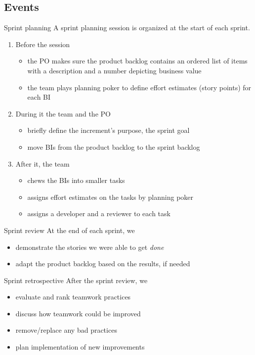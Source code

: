 \documentclass{beamer}
\begin{document}
\subsection{Events}
\begin{frame}{Sprint planning}
  A sprint planning session is organized at the start of each sprint.
  \begin{enumerate}
  \item Before the session
    \begin{itemize}
    \item the PO makes sure the \alert{product backlog} contains an ordered list
    of items with a description and a number depicting business value
    \item the team plays planning poker to define effort estimates
    (\alert{story points}) for each BI
    \end{itemize}
  \item During it the team and the PO
    \begin{itemize}
    \item briefly define the increment's purpose, the \alert{sprint goal}
    \item move BIs from the product backlog to the \alert{sprint backlog}
    \end{itemize}
  \item After it, the team
    \begin{itemize}
    \item chews the BIs into \alert{smaller tasks}
    \item assigns effort estimates on the tasks by \alert{planning poker}
    \item assigns a \alert{developer and a reviewer} to each task
    \end{itemize}
  \end{enumerate}
\end{frame}
\begin{frame}{Sprint review}
  At the end of each sprint, we
  \begin{itemize}
  \item demonstrate the stories we were able to get \emph{done}
  \item adapt the product backlog based on the results, if needed
  \end{itemize}
\end{frame}
\begin{frame}{Sprint retrospective}
  After the sprint review, we
  \begin{itemize}
  \item evaluate and rank teamwork practices
  \item discuss how teamwork could be improved
  \item remove/replace any bad practices
  \item plan implementation of new improvements
  \end{itemize}
\end{frame}
\end{document}
